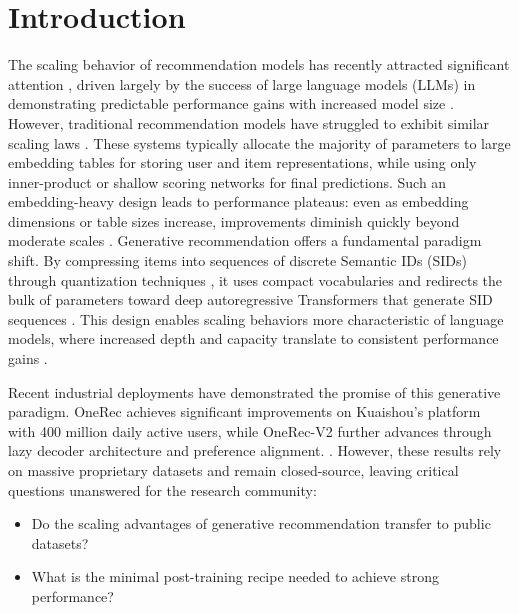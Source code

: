 \clearpage
\tableofcontents
\clearpage

\section{Introduction}
The scaling behavior of recommendation models has recently attracted significant attention \citep{OneRec, mtgr, HSTU, Wukong, URM, RankMixer, HLLM, OnePiece}, driven largely by the success of large language models (LLMs) in demonstrating predictable performance gains with increased model size \citep{GPT3, gpt4, deepseek, qwen2.5, mistral-7b, llama3, Llama2, Deepseek-r1}.
However, traditional recommendation models have struggled to exhibit similar scaling laws \citep{SASRec, GRU4Rec, Caser, SGL, survey_seq}.
These systems typically allocate the majority of parameters to large embedding tables for storing user and item representations, while using only inner-product or shallow scoring networks for final predictions.
Such an embedding-heavy design leads to performance plateaus: even as embedding dimensions or table sizes increase, improvements diminish quickly beyond moderate scales \citep{DIN, DCN, DCNv2, DeepFM}.
Generative recommendation offers a fundamental paradigm shift.
By compressing items into sequences of discrete Semantic IDs (SIDs) through quantization techniques \citep{rqkmeans, rqvae}, it uses compact vocabularies and redirects the bulk of parameters toward deep autoregressive Transformers that generate SID sequences \citep{TIGER, LCRec, TOKENRec, OneRec, OnePiece}.
This design enables scaling behaviors more characteristic of language models, where increased depth and capacity translate to consistent performance gains \citep{OneRec}.

Recent industrial deployments have demonstrated the promise of this generative paradigm.
OneRec \citep{OneRec, onerec-tech-v1} achieves significant improvements on Kuaishou's platform with 400 million daily active users, while OneRec-V2 \citep{onerec-tech-v2} further advances through lazy decoder architecture and preference alignment. 
.
However, these results rely on massive proprietary datasets and remain closed-source, leaving critical questions unanswered for the research community:
\begin{itemize}
    \item Do the scaling advantages of generative recommendation transfer to public datasets?
    \item What is the minimal post-training recipe needed to achieve strong performance?
\end{itemize}

